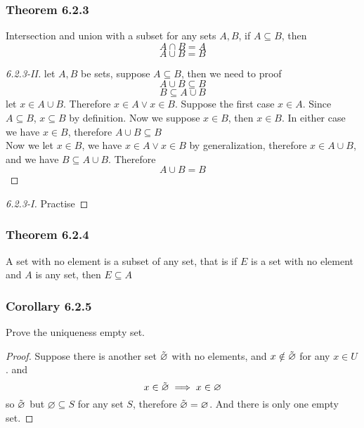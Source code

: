 \documentclass[12pt]{book}
\begin{document}
    \subsubsection{Theorem 6.2.3}
        Intersection and union with a subset for any sets $A,B$, if $A \subseteq B$, then 
        \[
        A \cap B = A
        \]
        \[
        A \cup B = B
        \]
        \begin{proof}[6.2.3-II]
            let $A,B$ be sets, suppose $A \subseteq B$, then we need to proof
            \[
            A \cup B \subseteq B
            \]
            \[
            B \subseteq A \cup B
            \]
            let $x \in A \cup B$. Therefore $x \in A \vee x \in B$. Suppose the first case $x \in A$. Since $A \subseteq B$, $x \subseteq B$ by definition. Now we suppose $x \in B$, then $x \in B$. In either case we have $x \in B$, therefore $A \cup B \subseteq B$\\
            Now we let $x \in B$, we have $x \in A \vee x \in B$ by generalization, therefore $x \in A \cup B$, and we have $B \subseteq A \cup B$.
            Therefore
            \[
            A \cup B = B
            \]
        \end{proof}
        \begin{proof}[6.2.3-I]
            Practise
        \end{proof}

    \subsubsection{Theorem 6.2.4}
    A set with no element is a subset of any set, that is if $E$ is a set with no element and $A$ is any set, then $E \subseteq A$
    

    \subsubsection{Corollary 6.2.5}
    Prove the uniqueness empty set.
    \begin{proof}
        Suppose there is another set $\Tilde{\varnothing}$ with no elements, and $x \notin \Tilde{\varnothing}$ for any $x \in U$. and
        \[
        x \in \Tilde{\varnothing} \implies x \in \varnothing
        \]
        so $\Tilde{\varnothing}$ but $\varnothing \subseteq S$ for any set $S$, therefore $\Tilde{\varnothing} = \varnothing$. And there is only one empty set. 
    \end{proof}
\end{document}
